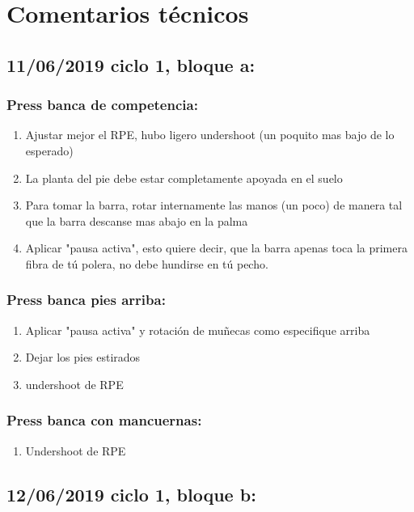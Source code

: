\documentclass[11pt]{article}
\begin{document}
\section{Comentarios técnicos}
\label{sec:orge541751}
\subsection{11/06/2019 ciclo 1, bloque a:}
\label{sec:orgd3c5600}
\subsubsection{Press banca de competencia:}
\label{sec:orgd49a99f}

\begin{enumerate}
\item Ajustar mejor el RPE, hubo ligero undershoot (un poquito mas bajo
de lo esperado)
\item La planta del pie debe estar completamente apoyada en el suelo
\item Para tomar la barra, rotar internamente las manos (un poco) de
manera tal que la barra descanse mas abajo en la palma
\item Aplicar "pausa activa", esto quiere decir, que la barra apenas toca
la primera fibra de tú polera, no debe hundirse en tú pecho.
\end{enumerate}

\subsubsection{Press banca pies arriba:}
\label{sec:orgdddb326}

\begin{enumerate}
\item Aplicar "pausa activa" y rotación de muñecas como especifique
arriba
\item Dejar los pies estirados
\item undershoot de RPE
\end{enumerate}

\subsubsection{Press banca con mancuernas:}
\label{sec:org4dce0c9}

\begin{enumerate}
\item Undershoot de RPE
\end{enumerate}

\subsection{12/06/2019 ciclo 1, bloque b:}
\label{sec:org59e2442}
\end{document}
